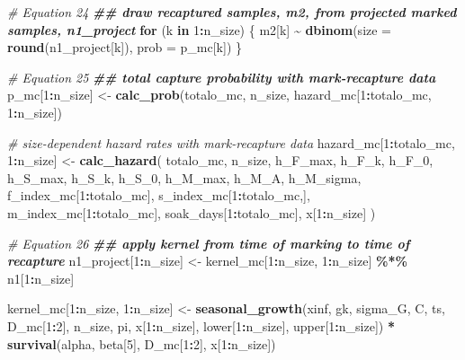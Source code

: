 \documentclass[
]{article}
\newenvironment{Shaded}{\begin{snugshade}}{\end{snugshade}}
\newcommand{\AttributeTok}[1]{\textcolor[rgb]{0.13,0.29,0.53}{#1}}
\newcommand{\CommentTok}[1]{\textcolor[rgb]{0.56,0.35,0.01}{\textit{#1}}}
\newcommand{\ControlFlowTok}[1]{\textcolor[rgb]{0.13,0.29,0.53}{\textbf{#1}}}
\newcommand{\DecValTok}[1]{\textcolor[rgb]{0.00,0.00,0.81}{#1}}
\newcommand{\DocumentationTok}[1]{\textcolor[rgb]{0.56,0.35,0.01}{\textbf{\textit{#1}}}}
\newcommand{\FunctionTok}[1]{\textcolor[rgb]{0.13,0.29,0.53}{\textbf{#1}}}
\newcommand{\NormalTok}[1]{#1}
\newcommand{\OtherTok}[1]{\textcolor[rgb]{0.56,0.35,0.01}{#1}}
\newcommand{\SpecialCharTok}[1]{\textcolor[rgb]{0.81,0.36,0.00}{\textbf{#1}}}
\begin{document}
\begin{Shaded}
\begin{Highlighting}[]
  \CommentTok{\# Equation 24}
  \DocumentationTok{\#\# draw recaptured samples, m2, from projected marked samples, n1\_project}
  \ControlFlowTok{for}\NormalTok{ (k }\ControlFlowTok{in} \DecValTok{1}\SpecialCharTok{:}\NormalTok{n\_size) \{}
\NormalTok{    m2[k] }\SpecialCharTok{\textasciitilde{}} \FunctionTok{dbinom}\NormalTok{(}\AttributeTok{size =} \FunctionTok{round}\NormalTok{(n1\_project[k]), }\AttributeTok{prob =}\NormalTok{ p\_mc[k])}
\NormalTok{  \}}
  
  \CommentTok{\# Equation 25}
  \DocumentationTok{\#\# total capture probability with mark{-}recapture data}
\NormalTok{  p\_mc[}\DecValTok{1}\SpecialCharTok{:}\NormalTok{n\_size] }\OtherTok{\textless{}{-}} \FunctionTok{calc\_prob}\NormalTok{(totalo\_mc, n\_size,}
\NormalTok{                              hazard\_mc[}\DecValTok{1}\SpecialCharTok{:}\NormalTok{totalo\_mc, }\DecValTok{1}\SpecialCharTok{:}\NormalTok{n\_size])}
  
  \CommentTok{\# size{-}dependent hazard rates with mark{-}recapture data}
\NormalTok{  hazard\_mc[}\DecValTok{1}\SpecialCharTok{:}\NormalTok{totalo\_mc, }\DecValTok{1}\SpecialCharTok{:}\NormalTok{n\_size] }\OtherTok{\textless{}{-}} \FunctionTok{calc\_hazard}\NormalTok{(}
\NormalTok{    totalo\_mc, n\_size, h\_F\_max, h\_F\_k, h\_F\_0, h\_S\_max, h\_S\_k, h\_S\_0, h\_M\_max,}
\NormalTok{        h\_M\_A, h\_M\_sigma, f\_index\_mc[}\DecValTok{1}\SpecialCharTok{:}\NormalTok{totalo\_mc], s\_index\_mc[}\DecValTok{1}\SpecialCharTok{:}\NormalTok{totalo\_mc,],}
\NormalTok{        m\_index\_mc[}\DecValTok{1}\SpecialCharTok{:}\NormalTok{totalo\_mc], soak\_days[}\DecValTok{1}\SpecialCharTok{:}\NormalTok{totalo\_mc], x[}\DecValTok{1}\SpecialCharTok{:}\NormalTok{n\_size]}
\NormalTok{  )}
  
  \CommentTok{\# Equation 26}
  \DocumentationTok{\#\# apply kernel from time of marking to time of recapture}
\NormalTok{  n1\_project[}\DecValTok{1}\SpecialCharTok{:}\NormalTok{n\_size] }\OtherTok{\textless{}{-}}\NormalTok{ kernel\_mc[}\DecValTok{1}\SpecialCharTok{:}\NormalTok{n\_size, }\DecValTok{1}\SpecialCharTok{:}\NormalTok{n\_size] }\SpecialCharTok{\%*\%}\NormalTok{ n1[}\DecValTok{1}\SpecialCharTok{:}\NormalTok{n\_size]}
  
\NormalTok{  kernel\_mc[}\DecValTok{1}\SpecialCharTok{:}\NormalTok{n\_size, }\DecValTok{1}\SpecialCharTok{:}\NormalTok{n\_size] }\OtherTok{\textless{}{-}} \FunctionTok{seasonal\_growth}\NormalTok{(xinf, gk, sigma\_G, C, ts, }
\NormalTok{                                                   D\_mc[}\DecValTok{1}\SpecialCharTok{:}\DecValTok{2}\NormalTok{], n\_size,  pi, }
\NormalTok{                                                   x[}\DecValTok{1}\SpecialCharTok{:}\NormalTok{n\_size], lower[}\DecValTok{1}\SpecialCharTok{:}\NormalTok{n\_size], }
\NormalTok{                                                   upper[}\DecValTok{1}\SpecialCharTok{:}\NormalTok{n\_size]) }\SpecialCharTok{*} 
    \FunctionTok{survival}\NormalTok{(alpha, beta[}\DecValTok{5}\NormalTok{], D\_mc[}\DecValTok{1}\SpecialCharTok{:}\DecValTok{2}\NormalTok{], x[}\DecValTok{1}\SpecialCharTok{:}\NormalTok{n\_size])}
  

\end{Highlighting}
\end{Shaded}
\end{document}
